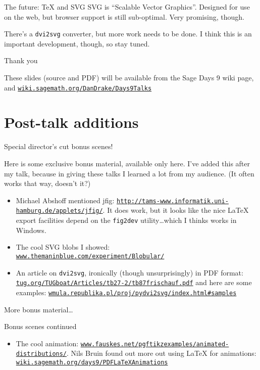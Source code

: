 \documentclass{beamer}
\newcommand{\myhref}[1]{\href{http://#1}{\texttt{#1}}}
\begin{document}
\begin{frame}{The future: \TeX{} and SVG}
   SVG is ``Scalable Vector Graphics''. Designed for use on the web, but
   browser support is still sub-optimal. Very promising, though.

   \vspace{10pt}

   There's a \texttt{dvi2svg} converter, but more work needs to be done.
   I think this is an important development, though, so stay tuned.
\end{frame}

\begin{frame}{Thank you}

  These slides (source and PDF) will be available from the Sage Days 9
  wiki page, and \href{http://wiki.sagemath.org/DanDrake/Days9Talks}
  {\texttt{wiki.sagemath.org/DanDrake/Days9Talks}}

\end{frame}

\section{Post-talk additions}

\begin{frame}{Special director's cut bonus scenes!}

  Here is some exclusive bonus material, available only here. I've added
  this after my talk, because in giving these talks I learned a lot from
  my audience. (It often works that way, doesn't it?)

  \begin{itemize}
    \item Michael Abshoff mentioned jfig:
    \myhref{http://tams-www.informatik.uni-hamburg.de/applets/jfig/}. It
    does work, but it looks like the nice \LaTeX{} export facilities
    depend on the \texttt{fig2dev} utility\ldots which I thinks works in
    Windows.
   \item The cool SVG blobs I showed:
   \myhref{www.themaninblue.com/experiment/Blobular/}
   \item An article on \texttt{dvi2svg}, ironically (though
   unsurprisingly) in PDF format:
   \myhref{tug.org/TUGboat/Articles/tb27-2/tb87frischauf.pdf} and here
   are some examples:
   \myhref{wmula.republika.pl/proj/pydvi2svg/index.html\#samples}
 \end{itemize}
 
 More bonus material\ldots
 \end{frame}

\begin{frame}{Bonus scenes continued}
 
 \begin{itemize}
   \item The cool \tikZ{} animation:
   \myhref{www.fauskes.net/pgftikzexamples/animated-distributions/}.
   Nils Bruin found out more out using \LaTeX{} for animations:
   \myhref{wiki.sagemath.org/days9/PDFLaTeXAnimations}
  \end{itemize}
\end{frame}
\end{document}
